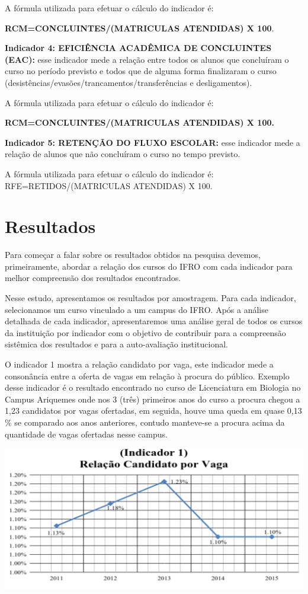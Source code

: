 \documentclass[article,12pt,onesidea,4paper,english,brazil]{abntex2}
\begin{document}
	A fórmula utilizada para efetuar o cálculo do indicador é:
	
	\textbf{RCM=CONCLUINTES/(MATRICULAS ATENDIDAS) X 100}.
	
	\textbf{Indicador 4: EFICIÊNCIA ACADÊMICA DE CONCLUINTES (EAC):} esse indicador mede
	a relação entre todos os alunos que concluíram o curso no período previsto e todos que de alguma
	forma finalizaram o curso (desistências/evasões/trancamentos/transferências e desligamentos).
	
	A fórmula utilizada para efetuar o cálculo do indicador é:
	
	\textbf{RCM=CONCLUINTES/(MATRICULAS ATENDIDAS) X 100.}
	
	\textbf{Indicador 5: RETENÇÃO DO FLUXO ESCOLAR:} esse indicador mede a relação de alunos
	que não concluíram o curso no tempo previsto.
	
	A fórmula utilizada para efetuar o cálculo do indicador é:
	RFE=RETIDOS/(MATRICULAS ATENDIDAS) X 100.
	
	\section*{Resultados}
	
	Para começar a falar sobre os resultados obtidos na pesquisa devemos, primeiramente,
	abordar a relação dos cursos do IFRO com cada indicador para melhor compreensão dos
	resultados encontrados.

	Nesse estudo, apresentamos os resultados por amostragem. Para cada indicador,
	selecionamos um curso vinculado a um campus do IFRO. Após a análise detalhada de cada
	indicador, apresentaremos uma análise geral de todos os cursos da instituição por indicador com o
	objetivo de contribuir para a compreensão sistêmica dos resultados e para a auto-avaliação
	institucional.
	
	O indicador 1 mostra a relação candidato por vaga, este indicador mede a consonância
	entre a oferta de vagas em relação à procura do público. Exemplo desse indicador é o resultado
	encontrado no curso de Licenciatura em Biologia no Campus Ariquemes onde nos 3 (três)
	primeiros anos do curso a procura chegou a 1,23 candidatos por vagas ofertadas, em seguida,
	houve uma queda em quase 0,13 \% se comparado aos anos anteriores, contudo manteve-se a
	procura acima da quantidade de vagas ofertadas nesse campus.
	\begin{center}
		\includegraphics[width=0.7\linewidth]{PIP-97-1}
	\end{center}
	
\end{document}
